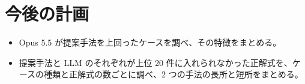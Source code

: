 \documentclass[a4j,dvipdfmx,10pt]{jresume}
\begin{document}
\section{今後の計画}\label{sec:plan}
\begin{itemize}[leftmargin=1.5em]
  \item Opus 5.5 が提案手法を上回ったケースを調べ、その特徴をまとめる。
  \item 提案手法と LLM のそれぞれが上位 20 件に入れられなかった正解式を、ケースの種類と正解式の数ごとに調べ、2 つの手法の長所と短所をまとめる。
\end{itemize}






\appendix
\def\thesection{Appendix \Alph{section}}
\end{document}
